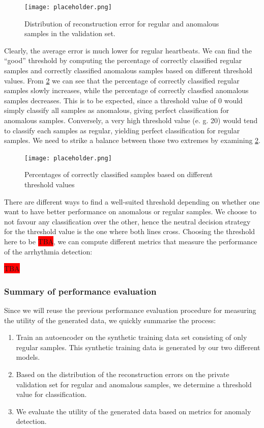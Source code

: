 \begin{figure}[h]
    \centering
    \texttt{[image: placeholder.png]}
    \caption{Distribution of reconstruction error for regular and anomalous samples in the validation set.}
    \label{fig:distr_err_baseline}
\end{figure}
Clearly, the average error is much lower for regular heartbeats. We can find the ``good'' threshold by computing the percentage of correctly classified regular samples and correctly classified anomalous samples based on different threshold values. From \cref{fig:thres_baseline} we can see that the percentage of correctly classified regular samples slowly increases, while the percentage of correctly classfied anomalous samples decreases. This is to be expected, since a threshold value of 0 would simply classify all samples as anomalous, giving perfect classification for anomalous samples. Conversely, a very high threshold value (e. g. 20) would tend to classify each samples as regular, yielding perfect classification for regular samples. We need to strike a balance between those two extremes by examining \cref{fig:thres_baseline}.

\begin{figure}[h]
    \centering
    \texttt{[image: placeholder.png]}
    \caption{Percentages of correctly classified samples based on different threshold values}
    \label{fig:thres_baseline}
\end{figure}

There are different ways to find a well-suited threshold depending on whether one want to have better performance on anomalous or regular samples. We choose to not favour any classification over the other, hence the neutral decision strategy for the threshold value is the one where both lines cross. Choosing the threshold here to be \colorbox{red}{TBA}, we can compute different metrics that measure the performance of the arrhythmia detection:

\colorbox{red}{TBA}


\subsubsection*{Summary of performance evaluation}
Since we will reuse the previous performance evaluation procedure for measuring the utility of the generated data, we quickly summarise the process:
\begin{enumerate}
    \item Train an autoencoder on the synthetic training data set consisting of only regular samples. This synthetic training data is generated by our two different models.
    \item Based on the distribution of the reconstruction errors on the private validation set for regular and anomalous samples, we determine a threshold value for classification.
    \item We evaluate the utility of the generated data based on metrics for anomaly detection.
\end{enumerate}

